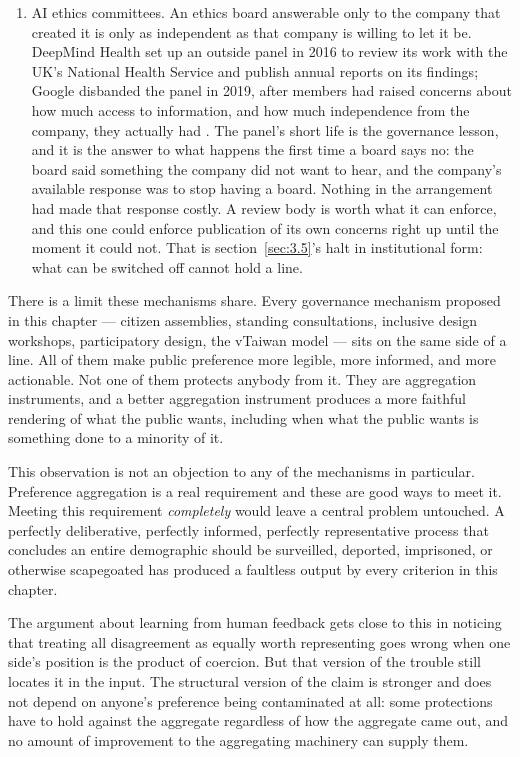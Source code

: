 \begin{enumerate}
  \item AI ethics committees. An ethics board answerable only to the company that created it is only as independent as that company is willing to let it be. DeepMind Health set up an outside panel in 2016 to review its work with the UK's National Health Service and publish annual reports on its findings; Google disbanded the panel in 2019, after members had raised concerns about how much access to information, and how much independence from the company, they actually had \autocite{fisher2019deepmind}. The panel's short life is the governance lesson, and it is the answer to what happens the first time a board says no: the board said something the company did not want to hear, and the company's available response was to stop having a board. Nothing in the arrangement had made that response costly. A review body is worth what it can enforce, and this one could enforce publication of its own concerns right up until the moment it could not. That is section~\ref{sec:3.5}'s halt in institutional form: what can be switched off cannot hold a line.
\end{enumerate}

There is a limit these mechanisms share. Every governance mechanism proposed in this chapter — citizen assemblies, standing consultations, inclusive design workshops, participatory design, the vTaiwan model — sits on the same side of a line. All of them make public preference more legible, more informed, and more actionable. Not one of them protects anybody from it. They are aggregation instruments, and a better aggregation instrument produces a more faithful rendering of what the public wants, including when what the public wants is something done to a minority of it.

This observation is not an objection to any of the mechanisms in particular. Preference aggregation is a real requirement and these are good ways to meet it. Meeting this requirement \emph{completely} would leave a central problem untouched. A perfectly deliberative, perfectly informed, perfectly representative process that concludes an entire demographic should be surveilled, deported, imprisoned, or otherwise scapegoated has produced a faultless output by every criterion in this chapter.

The argument about learning from human feedback gets close to this in noticing that treating all disagreement as equally worth representing goes wrong when one side's position is the product of coercion. But that version of the trouble still locates it in the input. The structural version of the claim is stronger and does not depend on anyone's preference being contaminated at all: some protections have to hold against the aggregate regardless of how the aggregate came out, and no amount of improvement to the aggregating machinery can supply them.

